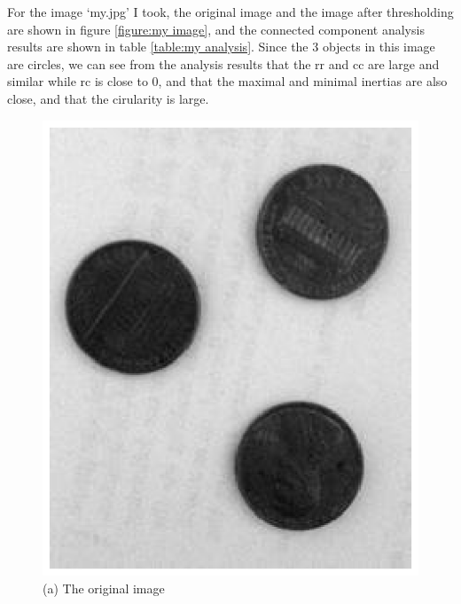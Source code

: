 \documentclass[a4paper]{article}
\begin{document}
For the image `my.jpg' I took, the original image and the image after thresholding are shown in figure \ref{figure:my image}, and the connected component analysis results are shown in table \ref{table:my analysis}. Since the 3 objects in this image are circles, we can see from the analysis results that the rr and cc are large and similar while rc is close to 0, and that the maximal and minimal inertias are also close, and that the cirularity is large.
\begin{figure}[h]
	\begin{minipage}[h]{0.5\linewidth}
		\centering
		\includegraphics{program/1/figure/my.eps}
		\caption*{(a) The original image}
		\label{subfigure:my-original}
	\end{minipage}
	\begin{minipage}[h]{0.5\linewidth}
		\centering

\end{minipage}
\end{figure}
\end{document}
